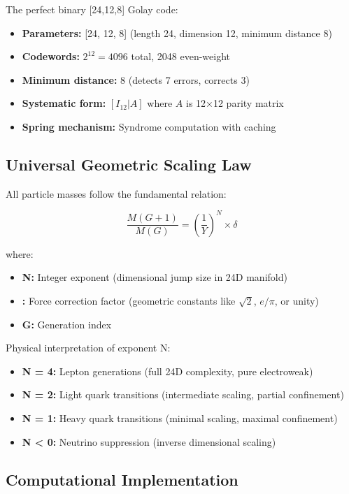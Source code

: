 \documentclass[11pt,twocolumn]{article}
\begin{document}
The perfect binary [24,12,8] Golay code:

\begin{itemize}
\item \textbf{Parameters:} [24, 12, 8] (length 24, dimension 12, minimum distance 8)
\item \textbf{Codewords:} $2^{12} = 4096$ total, 2048 even-weight
\item \textbf{Minimum distance:} 8 (detects 7 errors, corrects 3)
\item \textbf{Systematic form:} $[I_{12} | A]$ where $A$ is 12×12 parity matrix
\item \textbf{Spring mechanism:} Syndrome computation with caching
\end{itemize}

\subsection{Universal Geometric Scaling Law}

All particle masses follow the fundamental relation:

\begin{equation}
\frac{M(G+1)}{M(G)} = \left(\frac{1}{Y}\right)^N \times \delta
\end{equation}

where:
\begin{itemize}
\item \textbf{N:} Integer exponent (dimensional jump size in 24D manifold)
\item \textbf{\delta :} Force correction factor (geometric constants like $\sqrt{2}$, $e/\pi$, or unity)
\item \textbf{G:} Generation index
\end{itemize}

Physical interpretation of exponent N:
\begin{itemize}
\item \textbf{N = 4:} Lepton generations (full 24D complexity, pure electroweak)
\item \textbf{N = 2:} Light quark transitions (intermediate scaling, partial confinement)
\item \textbf{N = 1:} Heavy quark transitions (minimal scaling, maximal confinement)
\item \textbf{N < 0:} Neutrino suppression (inverse dimensional scaling)
\end{itemize}

\subsection{Computational Implementation}
\end{document}
